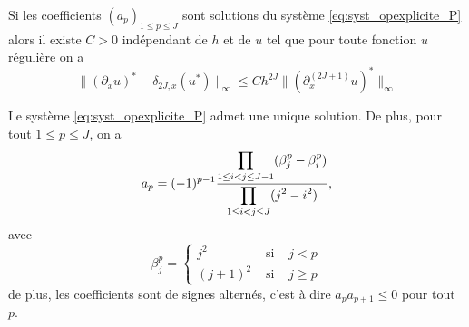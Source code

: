 \begin{corollaire}
Si les coefficients $(a_p)_{1 \leq p \leq J}$ sont solutions du système \eqref{eq:syst_opexplicite_P} alors il existe $C>0$ indépendant de $h$ et de $u$ tel que pour toute fonction $u$ régulière on a 
\begin{equation}
\| (\partial_x u)^* - \delta_{2J,x}(u^*) \|_{\infty} \leq C h^{2J} \| (\partial^{(2J+1)}_x u)^* \|_{\infty}
\end{equation} 
\end{corollaire}

\begin{proposition}
Le système \eqref{eq:syst_opexplicite_P} admet une unique solution. De plus, pour tout $1 \leq p \leq J$, on a
\begin{equation}
a_p = (-1)^{p-1} \dfrac{\displaystyle\prod\limits_{1 \leq i <j \leq J-1}(\beta_j^p - \beta_i^p)}{\displaystyle\prod\limits_{1 \leq i <j \leq J}(j^2 - i^2)},
\end{equation}
avec 
\begin{equation}
\beta^p_j = \left\lbrace
\begin{array}{ccl}
j^2 & \text{ si } & j<p \\
(j+1)^2 & \text{ si } & j \geq p
\end{array}
\right.
\end{equation}
de plus, les coefficients sont de signes alternés, c'est à dire $a_p a_{p+1} \leq 0$ pour tout $p$.
\end{proposition}

